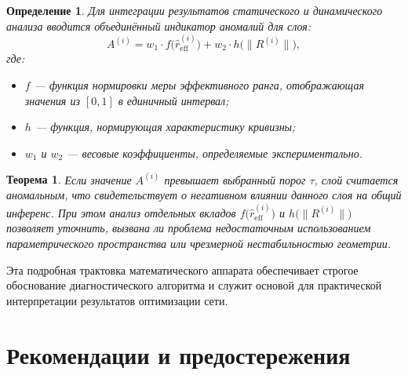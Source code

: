 \documentclass[a4paper,12pt]{article}
\newtheorem{theorem}{Теорема}
\newtheorem{definition}{Определение}
\begin{document}
\begin{definition}
Для интеграции результатов статического и динамического анализа вводится объединённый индикатор аномалий для слоя:
\begin{equation}
    A^{(i)} = w_1 \cdot f\bigl(\hat{r}_{\text{eff}}^{(i)}\bigr) + w_2 \cdot h\bigl(\|R^{(i)}\|\bigr),
\end{equation}
где:
\begin{itemize}[leftmargin=1.5cm]
\item \( f \) --- функция нормировки меры эффективного ранга, отображающая значения из \([0,1]\) в единичный интервал;
\item \( h \) --- функция, нормирующая характеристику кривизны;
\item \( w_1 \) и \( w_2 \) --- весовые коэффициенты, определяемые экспериментально.
\end{itemize}
\end{definition}

\begin{theorem}
Если значение \( A^{(i)} \) превышает выбранный порог \(\tau\), слой считается аномальным, что свидетельствует о негативном влиянии данного слоя на общий инференс. При этом анализ отдельных вкладов \( f\bigl(\hat{r}_{\text{eff}}^{(i)}\bigr) \) и \( h\bigl(\|R^{(i)}\|\bigr) \) позволяет уточнить, вызвана ли проблема недостаточным использованием параметрического пространства или чрезмерной нестабильностью геометрии.
\end{theorem}

Эта подробная трактовка математического аппарата обеспечивает строгое обоснование диагностического алгоритма и служит основой для практической интерпретации результатов оптимизации сети.

\bigskip

\section{Рекомендации и предостережения}
\end{document}
